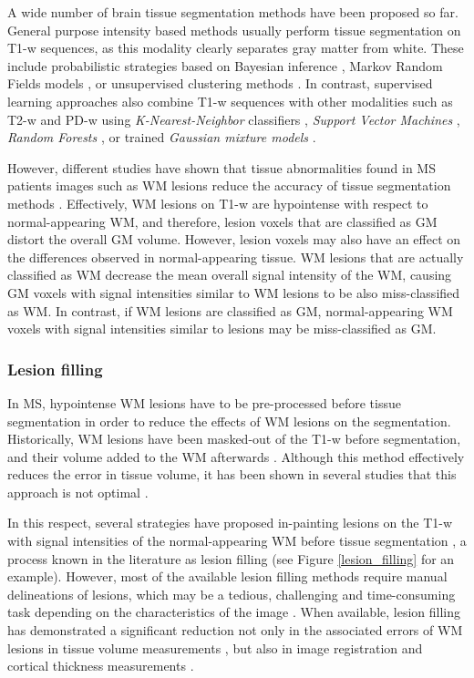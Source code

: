 A wide number of brain tissue segmentation methods have been proposed so far. General purpose intensity based methods usually perform tissue segmentation on T1-w sequences, as this modality clearly separates gray matter from white. These include probabilistic strategies based on Bayesian inference \cite{Ashburner2005,Marroquin2002, Roy2012,Shattuck2001}, Markov Random Fields models \cite{Bricq2008, Tohka2010, Zhang2001}, or unsupervised clustering methods \cite{Caldairou2011, Pham2001}. In contrast, supervised learning approaches also combine T1-w sequences with other modalities such as T2-w and PD-w using \textit{K-Nearest-Neighbor} classifiers \cite{deBoer2009,Vrooman2013}, \textit{Support Vector Machines} \cite{Akselrod2006,Opbroek2013}, \textit{Random Forests} \cite{yi2009,Mahapatra2014}, or trained \textit{Gaussian mixture models} \cite{Rajchl2015}. 

However, different studies have shown that tissue abnormalities found in MS patients images such as WM lesions reduce the accuracy of tissue segmentation methods \cite{Battaglini2012, Chard2010}. Effectively, WM lesions on T1-w are hypointense with respect to normal-appearing WM, and  therefore, lesion voxels that are classified as GM distort the overall GM volume. However, lesion voxels may also have an effect on the differences observed in normal-appearing tissue. WM lesions that are actually classified as WM decrease the mean overall signal intensity of the WM, causing GM voxels with signal intensities similar to WM lesions to be also miss-classified as WM.  In contrast, if WM lesions are classified as GM, normal-appearing WM voxels with signal intensities similar to lesions may be miss-classified as GM. 
 
\subsubsection{Lesion filling}
\label{subsec:lesion_filling}
In MS, hypointense WM lesions have to be pre-processed before tissue segmentation in order to reduce the effects of WM lesions on the segmentation. Historically, WM lesions have been masked-out of the T1-w before segmentation, and their volume added to the WM afterwards \cite{Chard2002}. Although this method effectively reduces the error in tissue volume, it has been shown in several studies that this approach is not optimal \cite{Battaglini2012, Chard2010}. 

In this respect, several strategies have proposed in-painting lesions on the T1-w with signal intensities of the normal-appearing WM before tissue segmentation \cite{Battaglini2012, Chard2010, Magon2014, Sdika2009}, a process known in the literature as lesion filling (see Figure \ref{lesion_filling} for an example). However, most of the available lesion filling methods require manual delineations of lesions, which may be a tedious, challenging and time-consuming task depending on the characteristics of the image \cite{Llado2012}. When available, lesion filling has demonstrated  a significant reduction not only in the associated errors of WM lesions in tissue volume measurements \cite{Popescu2014}, but also in image registration \cite{Ceccarelli2012,  Diez2014, Sdika2009} and cortical thickness measurements \cite{Magon2014}. 

